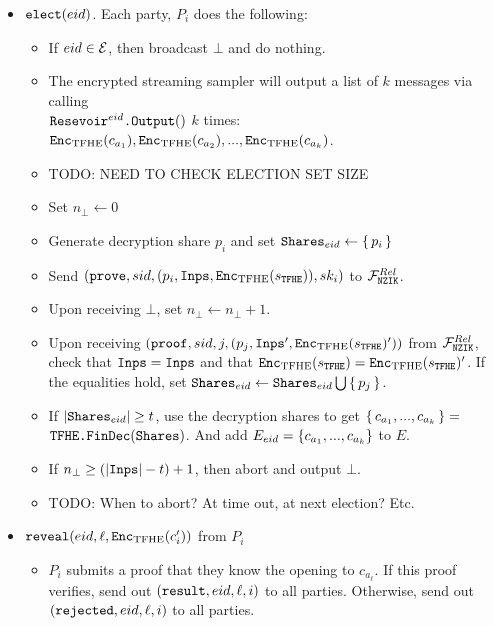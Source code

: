 \begin{mdframed}
\begin{itemize}
		\item $\texttt{elect}({eid})$. Each party, $P_i$ does the following:
		      \begin{itemize}
			      \item If ${eid} \in \mathcal{E}$, then broadcast $\bot$ and do nothing.
			      \item The encrypted streaming sampler will output a list of $k$ messages via calling \\$\texttt{Resevoir}^{{eid}}\texttt{.Output}()$ $k$ times: $\texttt{Enc}_{\mathrm{TFHE}}(c_{a_1}), \texttt{Enc}_{\mathrm{TFHE}}(c_{a_2}), ..., \texttt{Enc}_{\mathrm{TFHE}}(c_{a_k})$.
			      \item TODO: NEED TO CHECK ELECTION SET SIZE
			      \item Set $n_\bot \gets 0$
			      \item Generate decryption share $p_i$ and set $\texttt{Shares}_{eid} \gets \set{p_i}$
			      \item Send $(\texttt{prove}, sid, (p_i, \texttt{Inps}, \texttt{Enc}_{\mathrm{TFHE}}(s_{\texttt{TFHE}})), sk_i)$ to $\mathcal{F}_{\texttt{NZIK}}^{Rel}$.
			      \item Upon receiving $\bot$, set $n_\bot \gets n_\bot + 1$.
			      \item Upon receiving $(\texttt{proof}, sid, j, (p_j, \texttt{Inps}', \texttt{Enc}_{\mathrm{TFHE}}(s_{\texttt{TFHE}})'))$ from $\mathcal{F}_{\texttt{NZIK}}^{Rel}$,
			            check that $\texttt{Inps} = \texttt{Inps}$ and that $\texttt{Enc}_{\mathrm{TFHE}}(s_{\texttt{TFHE}}) = \texttt{Enc}_{\mathrm{TFHE}}(s_{\texttt{TFHE}})'$.
			            If the equalities hold, set $\texttt{Shares}_{eid} \gets \texttt{Shares}_{eid} \bigcup \set{p_j}$.
			      \item If $|\texttt{Shares}_{eid}| \geq t$, use the decryption shares to get $\set{c_{a_1}, ..., c_{a_k}} =$\\ $\texttt{TFHE.FinDec}(\texttt{Shares})$.
			            And add $E_{eid} = \left\{c_{a_1}, ..., c_{a_k}\right\}$ to $E$.
			      \item If $n_\bot \geq (|\texttt{Inps}| - t) + 1$, then abort and output $\bot$.
			      \item TODO: When to abort? At time out, at next election? Etc.
		      \end{itemize}
		      \pagebreak
		\item $\texttt{reveal}({eid}, \ell, \texttt{Enc}_{\mathrm{TFHE}}(c'_i))$ from $P_i$
		      \begin{itemize}
			      \item $P_i$ submits a proof that they know the opening to $c_{a_\ell}$.
			            If this proof verifies, send out $(\texttt{result}, {eid}, \ell, i)$ to all parties.
			            Otherwise, send out $(\texttt{rejected}, {eid}, \ell, i)$ to all parties.
		      \end{itemize}
	\end{itemize}
\end{mdframed}
